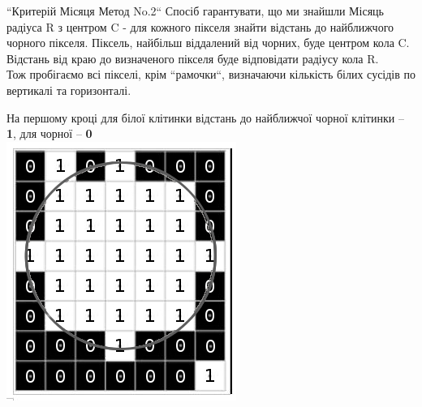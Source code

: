 \documentclass{beamer}
\begin{document}
\begin{frame}{``Критерій Місяця Метод No.2``}
Спосіб гарантувати, що ми знайшли Місяць радіуса R з центром C - для кожного пікселя знайти відстань до найближчого чорного пікселя. Піксель, найбільш віддалений від чорних, буде центром кола C. Відстань від краю до визначеного пікселя буде відповідати радіусу кола R. 
\\
Тож пробігаємо всі пікселі, крім ``рамочки``, визначаючи кількість білих сусідів по вертикалі та горизонталі. 

\end{frame}

\begin{frame}
На першому кроці для білої клітинки відстань до найближчої чорної клітинки -- \textbf{1}, для чорної -- \textbf{0} \\
\includegraphics[scale=0.5]{moon_1.jpg}

\end{frame}
\end{document}
